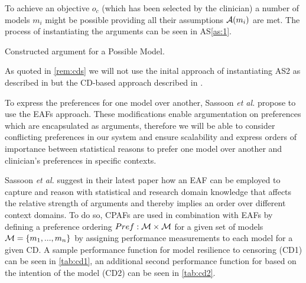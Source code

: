 To achieve an objective $o_c$ (which has been selected by the clinician) a number of models $m_i$ might be possible providing all their assumptions $\mathcal{A}(m_i)$ are met. The process of instantiating the arguments can be seen in AS\autoref{as:1}.

\begin{AS}[h]
\centering
	\caption{Constructed argument for a Possible Model.\label{as:1}}
\end{AS}

As quoted in \autoref{rem:cds} we will not use the inital approach of instantiating AS2 as described in \cite{sassoon2014} but the \gls{CD}-based approach described in \cite{sassoon2016CD}.

To express the preferences for one model over another, Sassoon \textit{et al.} \cite{sassoon2016} propose to use the \glspl{EAF} \cite{Modgil2009} approach. These modifications enable argumentation on preferences which are encapsulated as arguments, therefore we will be able to consider conflicting preferences in our system and ensure scalability and express orders of importance between statistical reasons to prefer one model over another and clinician's preferences in specific contexts.

Sassoon \textit{et al.} suggest in their latest paper \cite{sassoon2016CD} how an \gls{EAF} can be employed to capture and reason with statistical and research domain knowledge that affects the relative strength of arguments and thereby implies an order over different context domains. To do so, \glspl{CPAF} are used in combination with \glspl{EAF} by defining a preference ordering $Pref : \mathcal{M} \times \mathcal{M}$ for a given set of models $\mathcal{M} = \{m_1, ..., m_n\}$ by assigning performance measurements to each model for a given \gls{CD}. A sample performance function for model resilience to censoring (CD1) can be seen in \autoref{tab:cd1}, an additional second performance function for based on the intention of the model (CD2) can be seen in \autoref{tab:cd2}.


